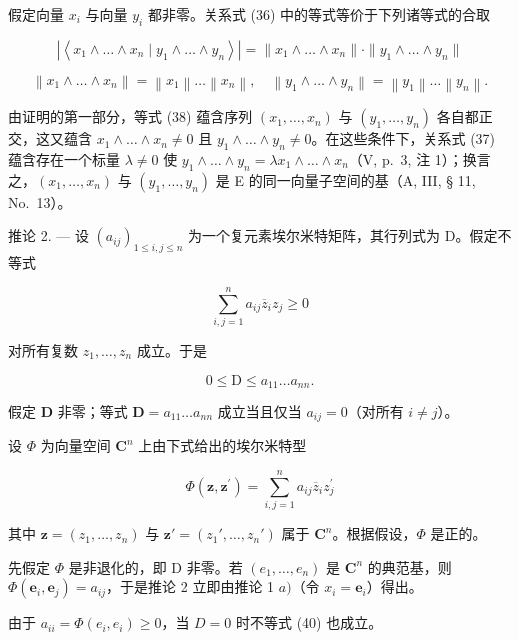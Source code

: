 假定向量 \(x_{i}\) 与向量 \(y_{i}\) 都非零。关系式 (36) 中的等式等价于下列诸等式的合取

\[
\left| \left\langle x _ {1} \wedge \dots \wedge x _ {n} \mid y _ {1} \wedge \dots \wedge y _ {n} \right\rangle \right| = \| x _ {1} \wedge \dots \wedge x _ {n} \| \cdot \| y _ {1} \wedge \dots \wedge y _ {n} \|\tag{37}
\]

\[
\left\| x _ {1} \wedge \dots \wedge x _ {n} \right\| = \left\| x _ {1} \right\| \dots \left\| x _ {n} \right\|, \quad \left\| y _ {1} \wedge \dots \wedge y _ {n} \right\| = \left\| y _ {1} \right\| \dots \left\| y _ {n} \right\|.\tag{38}
\]

由证明的第一部分，等式 (38) 蕴含序列 \((x_{1},\ldots ,x_{n})\) 与 \((y_{1},\ldots ,y_{n})\) 各自都正交，这又蕴含 \(x_{1}\wedge \ldots \wedge x_{n}\neq 0\) 且 \(y_{1}\wedge \ldots \wedge y_{n}\neq 0\)。在这些条件下，关系式 (37) 蕴含存在一个标量 \(\lambda \neq 0\) 使 \(y_{1}\wedge \ldots \wedge y_{n} = \lambda x_{1}\wedge \ldots \wedge x_{n}\)（V, p.~3, 注 1）；换言之，\((x_{1},\dots,x_{n})\) 与 \((y_{1},\dots,y_{n})\) 是 E 的同一向量子空间的基（A, III, § 11, No.~13）。

推论 2. --- 设 \((a_{ij})_{1\leqslant i,j\leqslant n}\) 为一个复元素埃尔米特矩阵，其行列式为 D。假定不等式

\[
\sum_ {i, j = 1} ^ {n} a _ {i j} \overline {{z}} _ {i} z _ {j} \geqslant 0\tag{39}
\]

对所有复数 \(z_{1}, \ldots, z_{n}\) 成立。于是

\[
0 \leqslant \mathrm{D} \leqslant a _ {1 1} \dots a _ {n n}.\tag{40}
\]

假定 \(\mathbf{D}\) 非零；等式 \(\mathbf{D} = a_{11} \ldots a_{nn}\) 成立当且仅当 \(a_{ij} = 0\)（对所有 \(i \neq j\)）。

设 \(\Phi\) 为向量空间 \(\mathbf{C}^n\) 上由下式给出的埃尔米特型

\[
\Phi (\mathbf {z}, \mathbf {z} ^ {\prime}) = \sum_ {i, j = 1} ^ {n} a _ {i j} \overline {{{{z}}}} _ {i} z _ {j} ^ {\prime}
\]

其中 \(\mathbf{z} = (z_1, \dots, z_n)\) 与 \(\mathbf{z}' = (z_1', \dots, z_n')\) 属于 \(\mathbf{C}^n\)。根据假设，\(\Phi\) 是正的。

先假定 \(\Phi\) 是非退化的，即 D 非零。若 \((e_1, \ldots, e_n)\) 是 \(\mathbf{C}^n\) 的典范基，则 \(\Phi(\mathbf{e}_i, \mathbf{e}_j) = a_{ij}\)，于是推论 2 立即由推论 1 \(a)\)（令 \(x_i = \mathbf{e}_i\)）得出。

由于 \(a_{ii} = \Phi(e_i, e_i) \geqslant 0\)，当 \(D = 0\) 时不等式 (40) 也成立。

